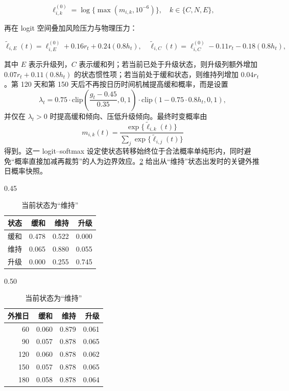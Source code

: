 \begin{equation}
\ell_{i,k}^{(0)}=\log\{\max(m_{i,k},10^{-6})\},\quad k\in\{C,N,E\},
\end{equation}

再在 logit 空间叠加风险压力与物理压力：

\begin{equation}
\tilde\ell_{i,E}(t)=\ell_{i,E}^{(0)}+0.16r_t+0.24(0.8h_t),\quad
\tilde\ell_{i,C}(t)=\ell_{i,C}^{(0)}-0.11r_t-0.18(0.8h_t),
\end{equation}

其中 \(E\) 表示升级列，\(C\) 表示缓和列；若当前已处于升级状态，则升级列额外增加 \(0.07r_t+0.11(0.8h_t)\) 的状态惯性项；若当前处于缓和状态，则维持列增加 \(0.04r_t\)。第 120 天和第 150 天后不再按日历时间机械提高缓和概率，而是设置
\[
\lambda_t=0.75\cdot \mathrm{clip}\left(\frac{g_t-0.45}{0.35},0,1\right)\cdot \mathrm{clip}(1-0.75\cdot0.8h_t,0,1),
\]
并仅在 \(\lambda_t>0\) 时提高缓和倾向、压低升级倾向。最终时变概率由
\[
m_{i,k}(t)=\frac{\exp\{\tilde\ell_{i,k}(t)\}}{\sum_j\exp\{\tilde\ell_{i,j}(t)\}}
\]
得到。这一 logit--softmax 设定使状态转移始终位于合法概率单纯形内，同时避免“概率直接加减再裁剪”的人为边界效应。\cref{tab:state-transition-snapshot} 给出从“维持”状态出发时的关键外推日概率快照。

\begin{table}[!htbp]
\centering
\caption{长期状态转移矩阵与时变概率快照}
\begin{subtable}[t]{0.45\linewidth}
\centering
\caption{基础矩阵}
\label{tab:state-transition-matrix}
\footnotesize
\begin{tabular}{lrrr}
\toprule
状态 & 缓和 & 维持 & 升级 \\
\midrule
缓和 & 0.478 & 0.522 & 0.000 \\
维持 & 0.065 & 0.880 & 0.055 \\
升级 & 0.000 & 0.255 & 0.745 \\
\bottomrule
\end{tabular}
\end{subtable}
\hfill
\begin{subtable}[t]{0.50\linewidth}
\centering
\caption{当前状态为“维持”}
\label{tab:state-transition-snapshot}
\footnotesize
\begin{tabular}{rrrr}
\toprule
外推日 & 缓和 & 维持 & 升级 \\
\midrule
60 & 0.060 & 0.879 & 0.061 \\
90 & 0.057 & 0.878 & 0.065 \\
120 & 0.060 & 0.878 & 0.062 \\
150 & 0.057 & 0.878 & 0.065 \\
180 & 0.058 & 0.878 & 0.064 \\
\bottomrule
\end{tabular}
\end{subtable}
\end{table}

